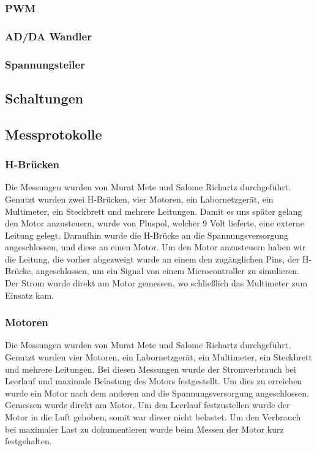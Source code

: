\documentclass{report}
\begin{document}
\subsubsection{PWM}

\subsubsection{AD/DA Wandler}

\subsubsection{Spannungsteiler}

\subsection{Schaltungen}

\subsection{Messprotokolle}

\subsubsection{H-Br\"{u}cken}
Die Messungen wurden von Murat Mete und Salome Richartz durchgef\"{u}hrt. Genutzt wurden zwei H-Br\"{u}cken, vier Motoren, ein Labornetzger\"{a}t, ein Multimeter, ein Steckbrett und mehrere Leitungen. Damit es uns sp\"{a}ter gelang den Motor anzusteuern, wurde von Pluspol, welcher 9 Volt lieferte, eine externe Leitung gelegt. Daraufhin wurde die H-Br\"{u}cke an die Spannungsversorgung angeschlossen, und diese an einen Motor. Um den Motor anzusteuern haben wir die Leitung, die vorher abgezweigt wurde an einem den zug\"{a}nglichen Pins, der H-Br\"{u}cke, angeschlossen, um ein Signal von einem Microcontroller zu simulieren. Der Strom wurde direkt am Motor gemessen, wo schlie{\ss}lich das Multimeter zum Einsatz kam.

\subsubsection{Motoren}

Die Messungen wurden von Murat Mete und Salome Richartz durchgef\"{u}hrt. Genutzt wurden vier Motoren, ein Labornetzger\"{a}t, ein Multimeter, ein Steckbrett und mehrere Leitungen. Bei diesen Messungen wurde der Stromverbrauch bei Leerlauf und maximale Belastung des Motors festgestellt. Um dies zu erreichen wurde ein Motor nach dem anderen and die Spannungsversorgung angeschlossen. Gemessen wurde direkt am Motor. Um den Leerlauf festzustellen wurde der Motor in die Luft gehoben, somit war dieser nicht belastet. Um den Verbrauch bei maximaler Last zu dokumentieren wurde beim Messen der Motor kurz festgehalten.
\end{document}
